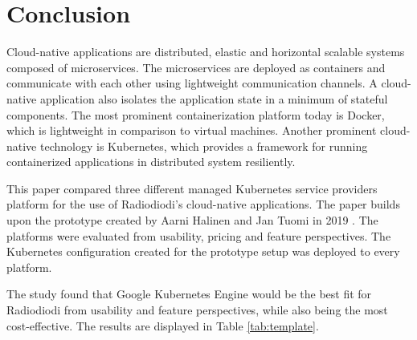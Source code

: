 \documentclass[article]{aaltoseries}
\begin{document}
\newpage
\section{Conclusion}

Cloud-native applications are distributed, elastic and horizontal scalable systems composed of microservices. The microservices are deployed as containers and communicate with each other using lightweight communication channels. A cloud-native application also isolates the application state in a minimum of stateful components. The most prominent containerization platform today is Docker, which is lightweight in comparison to virtual machines. Another prominent cloud-native technology is Kubernetes, which provides  a  framework  for  running  containerized  applications  in  distributed  system  resiliently.

This paper compared three different managed Kubernetes service providers platform for the use of Radiodiodi's cloud-native applications. The paper builds upon the prototype created by Aarni Halinen and Jan Tuomi in 2019 \cite{tuomihalinen2019}. The platforms were evaluated from usability, pricing and feature perspectives. The Kubernetes configuration created for the prototype setup was deployed to every platform.

The study found that Google Kubernetes Engine would be the best fit for Radiodiodi from usability and feature perspectives, while also being the most cost-effective. The results are displayed in Table \ref{tab:template}.

\newpage


\end{document}
